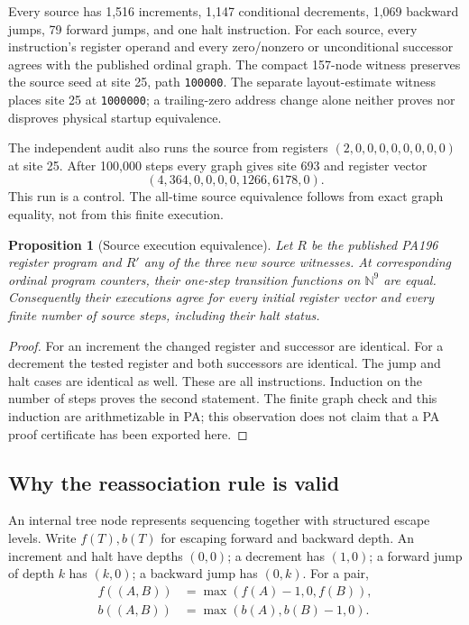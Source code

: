 \documentclass[11pt,letterpaper]{article}
\newtheorem{proposition}[theorem]{Proposition}
\newcommand{\N}{\mathbb N}
\newcommand{\file}[1]{\texttt{\nolinkurl{#1}}}
\begin{document}
Every source has 1,516 increments, 1,147 conditional decrements, 1,069
backward jumps, 79 forward jumps, and one halt instruction. For each source,
every instruction's register operand and every zero/nonzero or unconditional
successor agrees with the published ordinal graph. The compact 157-node
witness preserves the source seed at site 25, path \file{100000}.
The separate layout-estimate witness places site 25 at \file{1000000}; a
trailing-zero address change alone neither proves nor disproves physical
startup equivalence.

The independent audit also runs the source from registers
$(2,0,0,0,0,0,0,0,0)$ at site 25. After 100,000 steps every graph gives
site 693 and register vector
\[
 (4,364,0,0,0,0,1266,6178,0).
\]
This run is a control. The all-time source equivalence follows from exact
graph equality, not from this finite execution.

\begin{proposition}[Source execution equivalence]
Let $R$ be the published PA196 register program and $R'$ any of the three
new source witnesses. At corresponding ordinal program counters, their
one-step transition functions on $\N^9$ are equal. Consequently their
executions agree for every initial register vector and every finite number
of source steps, including their halt status.
\end{proposition}
\begin{proof}
For an increment the changed register and successor are identical. For a
decrement the tested register and both successors are identical. The jump
and halt cases are identical as well. These are all instructions.
Induction on the number of steps proves the second statement. The finite
graph check and this induction are arithmetizable in PA; this observation
does not claim that a PA proof certificate has been exported here.
\end{proof}

\subsection{Why the reassociation rule is valid}

An internal tree node represents sequencing together with structured escape
levels. Write $f(T),b(T)$ for escaping forward and backward depth. An
increment and halt have depths $(0,0)$; a decrement has $(1,0)$; a forward
jump of depth $k$ has $(k,0)$; a backward jump has $(0,k)$. For a pair,
\[
\begin{split}
 f((A,B))&=\max(f(A)-1,0,f(B)),\\
 b((A,B))&=\max(b(A),b(B)-1,0).
\end{split}
\]
\end{document}
